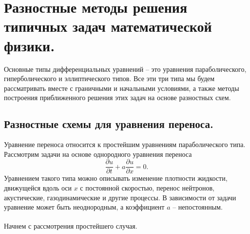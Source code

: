 \documentclass[a4paper, 12pt]{report}
\numberwithin{equation}{section}
\renewcommand{\d}{\partial}
\begin{document}
		 \chapter{Разностные методы решения типичных задач математической физики.}
		 Основные типы дифференциальных уравнений -- это уравнения параболического, гиперболического и эллиптического типов. Все эти три типа мы будем рассматривать вместе с граничными и начальными условиями, а также методы построения приближенного решения этих задач на основе разностных схем.
		 \section{Разностные схемы для уравнения переноса.}
		 Уравнение переноса относится к простейшим уравнениям параболического типа. Рассмотрим задачи на основе однородного уравнения переноса
		 $$\dfrac{\d u}{\d t}+ a \dfrac{\d u}{\d x} = 0.$$
		 Уравнением такого типа можно описывать изменение плотности жидкости, движущейся вдоль оси $x$ с постоянной скоростью, перенос нейтронов, акустические, газодинамические и другие процессы. В зависимости от задачи уравнение может быть неоднородным, а коэффициент $a$ -- непостоянным.\\\\
		 Начнем с рассмотрения простейшего случая.
\end{document}
